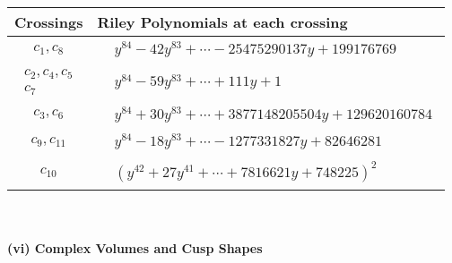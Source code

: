 \documentclass[1p]{elsarticle_modified}
\theoremstyle{definition}
\begin{document}
\begin{tabular}{m{50pt}|m{274pt}}
Crossings & \hspace{64pt}Riley Polynomials at each crossing \\
\hline $$\begin{aligned}c_{1},c_{8}\end{aligned}$$&$\begin{aligned}
&y^{84}-42 y^{83}+\cdots-25475290137 y+199176769
\end{aligned}$\\
\hline $$\begin{aligned}c_{2},c_{4},c_{5}\\c_{7}\end{aligned}$$&$\begin{aligned}
&y^{84}-59 y^{83}+\cdots+111 y+1
\end{aligned}$\\
\hline $$\begin{aligned}c_{3},c_{6}\end{aligned}$$&$\begin{aligned}
&y^{84}+30 y^{83}+\cdots+3877148205504 y+129620160784
\end{aligned}$\\
\hline $$\begin{aligned}c_{9},c_{11}\end{aligned}$$&$\begin{aligned}
&y^{84}-18 y^{83}+\cdots-1277331827 y+82646281
\end{aligned}$\\
\hline $$\begin{aligned}c_{10}\end{aligned}$$&$\begin{aligned}
&(y^{42}+27 y^{41}+\cdots+7816621 y+748225)^{2}
\end{aligned}$\\
\hline
\end{tabular}\\~\\
\newpage\flushleft \textbf{(vi) Complex Volumes and Cusp Shapes}
\end{document}
